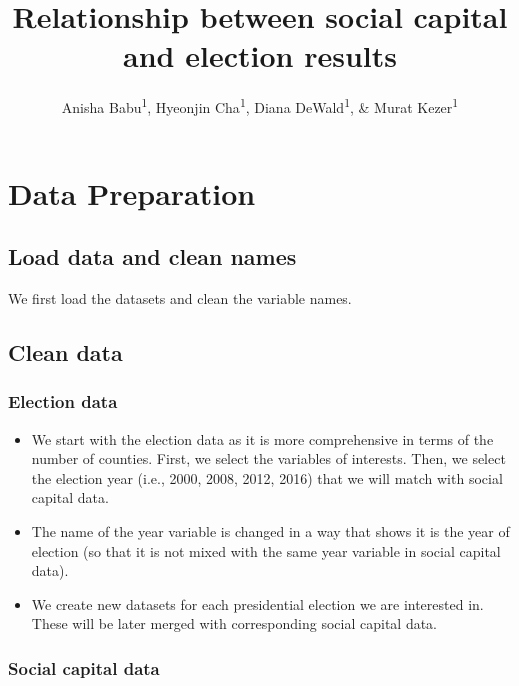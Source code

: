 \documentclass[
  english,
  man]{apa6}
\title{Relationship between social capital and election results}
\author{Anisha Babu\textsuperscript{1}, Hyeonjin Cha\textsuperscript{1}, Diana DeWald\textsuperscript{1}, \& Murat Kezer\textsuperscript{1}}
\date{}
\affiliation{\vspace{0.5cm}\textsuperscript{1} University of Oregon}
\begin{document}
\maketitle

\hypertarget{data-preparation}{%
\section{Data Preparation}\label{data-preparation}}

\hypertarget{load-data-and-clean-names}{%
\subsection{Load data and clean names}\label{load-data-and-clean-names}}

We first load the datasets and clean the variable names.

\hypertarget{clean-data}{%
\subsection{Clean data}\label{clean-data}}

\hypertarget{election-data}{%
\subsubsection{Election data}\label{election-data}}

\begin{itemize}
\item
  We start with the election data as it is more comprehensive in terms of the number of counties. First, we select the variables of interests. Then, we select the election year (i.e., 2000, 2008, 2012, 2016) that we will match with social capital data.
\item
  The name of the year variable is changed in a way that shows it is the year of election (so that it is not mixed with the same year variable in social capital data).
\item
  We create new datasets for each presidential election we are interested in. These will be later merged with corresponding social capital data.
\end{itemize}

\hypertarget{social-capital-data}{%
\subsubsection{Social capital data}\label{social-capital-data}}
\end{document}
